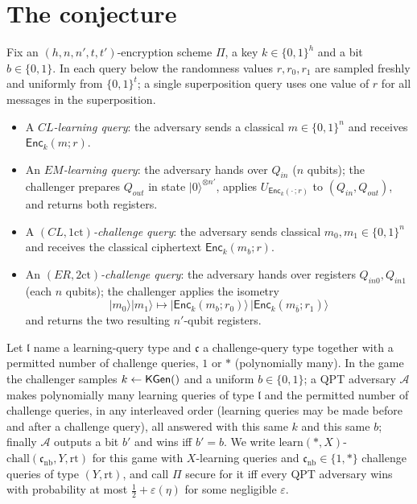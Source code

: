 \documentclass{aicr-conjecture}
\newcommand{\KGen}{\mathsf{KGen}}
\newcommand{\Enc}{\mathsf{Enc}}
\newcommand{\onect}{1\mathrm{ct}}
\newcommand{\twoct}{2\mathrm{ct}}
\newcommand{\learn}{\mathrm{learn}}
\newcommand{\chall}{\mathrm{chall}}
\newcommand{\cnb}{\mathfrak{c}_{\mathrm{nb}}}
\newcommand{\ket}[1]{|#1\rangle}
\begin{document}
\section{The conjecture}\label{sec:conjectures}

\begin{definition}\label{def:queries}
Fix an $(h,n,n',t,t')$-encryption scheme $\Pi$, a key
$k\in\{0,1\}^{h}$ and a bit $b\in\{0,1\}$. In each query below the
randomness values $r,r_0,r_1$ are sampled freshly and uniformly from
$\{0,1\}^{t}$; a single superposition query uses one value of $r$ for
all messages in the superposition.
\begin{itemize}
  \item A \emph{$CL$-learning query}: the adversary sends a classical
    $m\in\{0,1\}^{n}$ and receives $\Enc_k(m;r)$.
  \item An \emph{$EM$-learning query}: the adversary hands over
    $Q_{in}$ ($n$ qubits); the challenger prepares $Q_{out}$ in state
    $\ket{0}^{\otimes n'}$, applies $U_{\Enc_k(\cdot\,;r)}$ to
    $(Q_{in},Q_{out})$, and returns both registers.
  \item A \emph{$(CL,\onect)$-challenge query}: the adversary sends
    classical $m_0,m_1\in\{0,1\}^{n}$ and receives the classical
    ciphertext $\Enc_k(m_b;r)$.
  \item An \emph{$(ER,\twoct)$-challenge query}: the adversary hands
    over registers $Q_{in0},Q_{in1}$ (each $n$ qubits); the challenger
    applies the isometry
    \[
      \ket{m_0}\ket{m_1}\mapsto
      \ket{\Enc_k(m_b;r_0)}\,\ket{\Enc_k(m_{\bar b};r_1)}
    \]
    and returns the two resulting $n'$-qubit registers.
\end{itemize}
\end{definition}

\begin{definition}\label{def:indcpa}
Let $\mathfrak{l}$ name a learning-query type and $\mathfrak{c}$ a
challenge-query type together with a permitted number of challenge
queries, $1$ or $*$ (polynomially many). In the game the challenger
samples $k\sample\KGen()$ and a uniform $b\in\{0,1\}$; a QPT adversary
$\mathcal{A}$ makes polynomially many learning queries of type
$\mathfrak{l}$ and the permitted number of challenge queries, in any
interleaved order (learning queries may be made before and after a
challenge query), all answered with this same $k$ and this same $b$;
finally $\mathcal{A}$ outputs a bit $b'$ and wins iff $b'=b$. We write
$\learn(*,X)$-$\chall(\cnb,Y,\mathrm{rt})$ for this game with
$X$-learning queries and $\cnb\in\{1,*\}$ challenge queries of type
$(Y,\mathrm{rt})$, and call $\Pi$ secure for it iff every QPT adversary
wins with probability at most $\tfrac12+\varepsilon(\eta)$ for some
negligible $\varepsilon$.
\end{definition}
\end{document}
